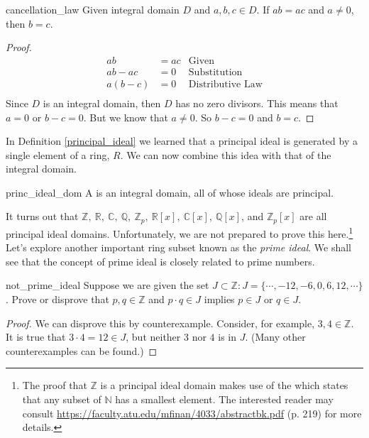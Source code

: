 \begin{prop}{cancellation_law}
Given integral domain $D$ and $a,b,c\in D$.  If $ab=ac$ and $a\neq 0$, then $b=c$.

\begin{proof}
\begin{align*}
    ab&=ac & \text{Given}\\
    ab-ac&=0 & \text{Substitution}\\
    a(b-c)&=0 & \text{Distributive Law}\\
\end{align*}
Since $D$ is an integral domain, then $D$ has no zero divisors.  This means that $a=0$ or $b-c=0$.  But we know that $a\neq 0$.  So $b-c=0$ and $b=c$.
\end{proof}
\end{prop}


In Definition \ref{principal_ideal} we learned that a principal ideal is generated by a single element of a ring, $R$.  We can now combine this idea with that of the integral domain.

\begin{defn}{princ_ideal_dom}
A  is an integral domain, all of whose ideals are principal.
\end{defn}

It turns out that ${\mathbb Z},~{\mathbb R},~{\mathbb C},~{\mathbb Q},~{\mathbb Z}_p,~{\mathbb R}[x],~{\mathbb C}[x],~{\mathbb Q}[x]$, and ${\mathbb Z}_p[x]$ are all principal ideal domains.  Unfortunately, we are not prepared to prove this here.\footnote{The proof that ${\mathbb Z}$ is a principal ideal domain makes use of the  which states that any subset of ${\mathbb N}$ has a smallest element.  The interested reader may consult \url{https://faculty.atu.edu/mfinan/4033/abstractbk.pdf} (p. 219) for more details.}\\

Let's explore another important ring subset known as the \emph{prime ideal}.  We shall see that the concept of prime ideal is closely related to prime numbers.


\begin{example}{not_prime_ideal}
Suppose we are given the set $J\subset{\mathbb Z}:J=\{\cdots,-12,-6,0,6,12,\cdots\}$.  Prove or disprove that $p,q\in{\mathbb Z}$ and $p\cdot q\in J$ implies $p\in J$ or $q\in J$. 
\end{example}

\begin{proof}
We can disprove this by counterexample.  Consider, for example, $3,4\in{\mathbb Z}$.  It is true that $3\cdot 4=12\in J$, but neither $3$ nor $4$ is in $J$.  (Many other counterexamples can be found.)
\end{proof}

